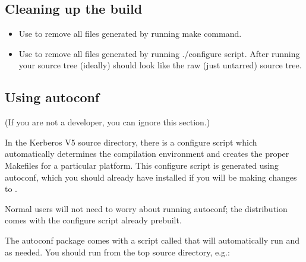 \documentclass[letterpaper,10pt,english]{sphinxmanual}
\begin{document}
\subsection{Cleaning up the build}
\label{\detokenize{build/doing_build:cleaning-up-the-build}}\begin{itemize}
\item {} 
\sphinxAtStartPar
Use  to remove all files generated by running make
command.

\item {} 
\sphinxAtStartPar
Use  to remove all files generated by running
./configure script.  After running  your source
tree (ideally) should look like the raw (just un\sphinxhyphen{}tarred) source
tree.

\end{itemize}


\subsection{Using autoconf}
\label{\detokenize{build/doing_build:using-autoconf}}
\sphinxAtStartPar
(If you are not a developer, you can ignore this section.)

\sphinxAtStartPar
In the Kerberos V5 source directory, there is a configure script which
automatically determines the compilation environment and creates the
proper Makefiles for a particular platform.  This configure script is
generated using autoconf, which you should already have installed if
you will be making changes to .

\sphinxAtStartPar
Normal users will not need to worry about running autoconf; the
distribution comes with the configure script already prebuilt.

\sphinxAtStartPar
The autoconf package comes with a script called  that
will automatically run  and  as needed.  You
should run  from the top source directory, e.g.:

\begin{sphinxVerbatim}[commandchars=\\\{\}]
 
 
\end{sphinxVerbatim}
\end{document}
